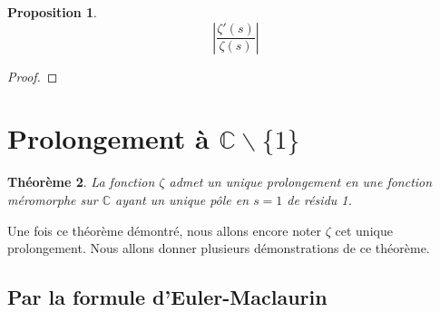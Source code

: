 \documentclass[french]{report}
\newtheorem{theorem}{Théorème}[section]
\newtheorem{proposition}[theorem]{Proposition}
\begin{document}
\begin{proposition}
  \[ \left|\frac{\zeta'(s)}{\zeta(s)}\right| \]
\end{proposition}

\begin{proof}
  
\end{proof}

\section{Prolongement à $\mathbb{C}\backslash\{1\}$}

\begin{theorem}
  La fonction $\zeta$ admet un unique prolongement en une fonction méromorphe sur $\mathbb{C}$ ayant un unique pôle en $s=1$ de résidu 1.
\end{theorem}

Une fois ce théorème démontré, nous allons encore noter $\zeta$ cet unique prolongement. Nous allons donner plusieurs démonstrations de ce théorème.

\subsection{Par la formule d'Euler-Maclaurin}
\end{document}
